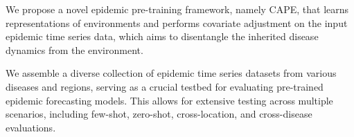 \begin{compactenum}[\textbullet]
    \item We propose a novel epidemic pre-training framework, namely CAPE, that learns representations of environments and performs covariate adjustment on the input epidemic time series data, which aims to disentangle the inherited disease dynamics from the environment. 

    \item We assemble a diverse collection of epidemic time series datasets from various diseases and regions, serving as {a crucial testbed} for evaluating pre-trained epidemic forecasting models. This allows for extensive testing across multiple scenarios, including few-shot, zero-shot, cross-location, and cross-disease evaluations.



    

\end{compactenum}
